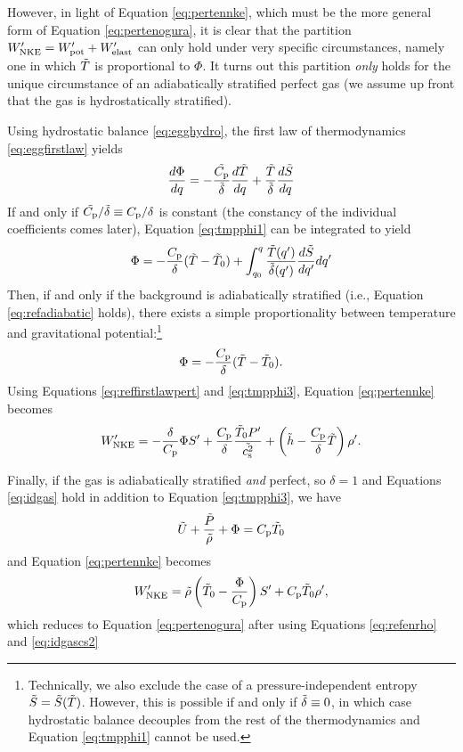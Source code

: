 \documentclass[12pt]{article}
\newcommand{\wpnke}{W^\prime_{\rm NKE}}
\newcommand{\wppot}{W^\prime_{\rm pot}}
\newcommand{\wpelast}{W^\prime_{\rm elast}}
\begin{document}
However, in light of Equation \eqref{eq:pertennke}, which must be the more general form of Equation \eqref{eq:pertenogura}, it is clear that the partition $\wpnke = \wppot + \wpelast$ can only hold under very specific circumstances, namely one in which $\tilde{T}$ is proportional to $\Phi$. It turns out this partition \textit{only} holds for the unique circumstance of an adiabatically stratified perfect gas (we assume up front that the gas is hydrostatically stratified). 

Using hydrostatic balance \eqref{eq:egghydro}, the first law of thermodynamics \eqref{eq:eggfirstlaw} yields
\begin{align}\label{eq:tmpphi1}
	\frac{d\Phi}{dq} = -\frac{\tilde{C_{\rm{p}}}}{\tilde{\delta}}\frac{d\tilde{T}}{dq} + \frac{\tilde{T}}{\tilde{\delta}}\frac{d\tilde{S}}{dq}
\end{align}
If and only if $\tilde{C_{\rm{p}}}/\tilde{\delta}\equiv C_{\rm{p}}/\delta$ is constant (the constancy of the individual coefficients comes later), Equation \eqref{eq:tmpphi1} can be integrated to yield
\begin{align}\label{eq:tmpphi2}
	\Phi = -\frac{C_{\rm{p}}}{\delta}(\tilde{T}-\tilde{T}_0) + \int_{q_0}^q\frac{\tilde{T}(q^\prime)}{\tilde{\delta}(q^\prime)}\frac{d\tilde{S}}{dq^\prime}dq^\prime
\end{align}
Then, if and only if the background is adiabatically stratified (i.e., Equation \eqref{eq:refadiabatic} holds), there exists a simple proportionality between temperature and gravitational potential:\footnote{Technically, we also exclude the case of a pressure-independent entropy $\tilde{S}=\tilde{S}(\tilde{T})$. However, this is possible if and only if $\tilde{\delta}\equiv0$, in which case hydrostatic balance decouples from the rest of the thermodynamics and Equation \eqref{eq:tmpphi1} cannot be used.}
\begin{align}\label{eq:tmpphi3}
	\Phi = -\frac{C_{\rm{p}}}{\delta}(\tilde{T}-\tilde{T}_0).
\end{align}
Using Equations \eqref{eq:reffirstlawpert} and \eqref{eq:tmpphi3}, Equation \eqref{eq:pertennke} becomes
\begin{align}\label{eq:pertennke2}
	\wpnke = -\frac{\delta}{\cpcap}\Phi \entrprime + \frac{\cpcap}{\delta}\frac{\tmptilde_0\prsprime}{\cssqtilde} + \left(\enthtilde - \frac{\cpcap}{\delta}\tmptilde\right)\rhoprime.
\end{align}
	

Finally, if the gas is adiabatically stratified \textit{and} perfect, so $\delta=1$ and Equations \eqref{eq:idgas} hold in addition to Equation \eqref{eq:tmpphi3}, we have
\begin{align}
	\tilde{U} + \frac{\tilde{P}}{\tilde{\rho}} + \Phi = C_{\rm{p}}\tilde{T}_0
\end{align}
and Equation \eqref{eq:pertennke} becomes
\begin{align}
	\wpnke = \rhotilde\left(\tmptilde_0 - \frac{\Phi}{\cpcap}\right)\entrprime + \cpcap\tmptilde_0\rhoprime,
\end{align}
which reduces to Equation \eqref{eq:pertenogura} after using Equations \eqref{eq:refenrho} and \eqref{eq:idgascs2}
 
\end{document}
